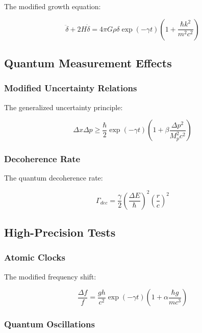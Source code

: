 \documentclass[12pt]{article}
\theoremstyle{plain}
\theoremstyle{definition}
\theoremstyle{remark}
\begin{document}
The modified growth equation:

\begin{equation}
\ddot{\delta} + 2H\dot{\delta} = 4\pi G\rho\delta\exp(-\gamma t)\left(1 + \frac{\hbar k^2}{m^2c^2}\right)
\end{equation}

\subsection{Quantum Measurement Effects}

\subsubsection{Modified Uncertainty Relations}

The generalized uncertainty principle:

\begin{equation}
\Delta x\Delta p \geq \frac{\hbar}{2}\exp(-\gamma t)\left(1 + \beta\frac{\Delta p^2}{M_p^2c^2}\right)
\end{equation}

\subsubsection{Decoherence Rate}

The quantum decoherence rate:

\begin{equation}
\Gamma_{dec} = \frac{\gamma}{2}\left(\frac{\Delta E}{\hbar}\right)^2\left(\frac{r}{c}\right)^2
\end{equation}

\subsection{High-Precision Tests}

\subsubsection{Atomic Clocks}

The modified frequency shift:

\begin{equation}
\frac{\Delta f}{f} = \frac{gh}{c^2}\exp(-\gamma t)\left(1 + \alpha\frac{\hbar g}{m c^3}\right)
\end{equation}

\subsubsection{Quantum Oscillations}
\end{document}
